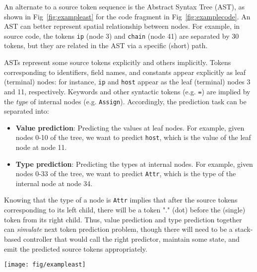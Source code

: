 \documentclass[nonacm, sigconf]{acmart}
\begin{document}
An alternate to a source token sequence is the Abstract Syntax Tree (AST), as shown in Fig~\ref{fig:exampleast} for the code fragment in Fig~\ref{fig:examplecode}. An AST can better represent spatial relationship between nodes. For example, in source code, the tokens \texttt{ip} (node 3) and \texttt{chain} (node 41) are separated by 30 tokens, but they are related in the AST via a specific (short) path.

ASTs represent some source tokens explicitly and others implicitly. Tokens corresponding to identifiers, field names, and constants appear explicitly as leaf (terminal) nodes: for instance, \texttt{ip} and \texttt{host} appear as the leaf (terminal) nodes 3 and 11, respectively. Keywords and other syntactic tokens (e.g. \texttt{=}) are implied by the \textit{type} of internal nodes (e.g. \texttt{Assign}).  Accordingly, the prediction task can be separated into:
\begin{itemize}
    \item \textbf{Value prediction}: Predicting the values at leaf nodes. For example, given nodes 0-10 of the tree, we want to predict \texttt{host}, which is the value of the leaf node at node 11.
    \item \textbf{Type prediction}: Predicting the types at internal nodes. For example, given nodes 0-33 of the tree, we want to predict \texttt{Attr}, which is the type of the internal node at node 34. 
\end{itemize}

Knowing that the type of a node is \texttt{Attr} implies that after the source tokens corresponding to its left child, there will be a token "." (dot) before the (single) token from its right child. Thus, value prediction and type prediction together can \emph{simulate} next token prediction problem, though there will need to be a stack-based controller that would call the right predictor,  maintain some state, and emit the predicted source tokens appropriately.

\begin{figure*}
\texttt{[image: fig/exampleast]}
\caption{AST for the example in Fig~\ref{fig:examplecode}. The leaf (terminal) nodes have values and the interior (non-terminal) nodes have types. }
\label{fig:exampleast}
\end{figure*}
\end{document}
